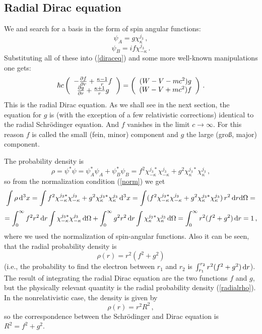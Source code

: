 \subsection{Radial Dirac equation}

We and search for a basis in the form of spin angular functions: 
\begin{equation}
  \psi_A=g\chi^{j_3}_{\kappa}\,,  \label{psia}
\end{equation}
\begin{equation}
  \psi_B=if\chi^{j_3}_{-\kappa}\,.  \label{psib}
\end{equation}
Substituting all of these into (\ref{diraceq}) and some more well-known manipulations one gets: 
\begin{equation}
  \hbar c \left(\begin{array}{c} -{\partial f\over\partial r}+{\kappa-1\over r}f\\ {\partial g\over\partial r}+{\kappa+1\over r}g\\ \end{array}\right)= \left(\begin{array}{c} (W-V-mc^2)g\\ (W-V+mc^2)f\\ \end{array}\right)\,.  \label{radialdirac}
\end{equation}
This is the radial Dirac equation. As we shall see in the next section, the equation for $g$ is (with the exception of a few relativistic corrections) identical to the radial Schrödinger equation. And $f$ vanishes in the limit $c\to\infty$. For this reason $f$ is called the small (fein, minor) component and $g$ the large (groß, major) component.

The probability density is 
\begin{equation*}
  \rho=\psi^*\psi=\psi^*_A\psi_A+\psi^*_B\psi_B= f^2\chi^{j_3*}_{-\kappa}\chi^{j_3}_{-\kappa}+ g^2\chi^{j_3*}_{\kappa}\chi^{j_3}_{\kappa}\,,
\end{equation*}
so from the normalization condition (\ref{norm}) we get 
\begin{equation*}
  \int \rho \,{\rm d}^3x= \int f^2\chi^{j_3*}_{-\kappa}\chi^{j_3}_{-\kappa}+ g^2\chi^{j_3*}_{\kappa}\chi^{j_3}_{\kappa} \,{\rm d}^3x= \int (f^2\chi^{j_3*}_{-\kappa}\chi^{j_3}_{-\kappa}+ g^2\chi^{j_3*}_{\kappa}\chi^{j_3}_{\kappa})\,r^2\,{\rm d} r{\rm d}\Omega=
\end{equation*}
\begin{equation*}
  =\int_0^\infty f^2r^2\,{\rm d} r\int\chi^{j_3*}_{-\kappa}\chi^{j_3}_{-\kappa} \,{\rm d}\Omega+ \int_0^\infty g^2r^2\,{\rm d} r\int\chi^{j_3*}_{\kappa}\chi^{j_3}_{\kappa} \,{\rm d}\Omega= \int_0^\infty r^2(f^2+g^2)\,{\rm d} r=1\,,
\end{equation*}
where we used the normalization of spin-angular functions. Also it can be seen, that the radial probability density is 
\begin{equation}
  \rho(r)=r^2(f^2+g^2)  \label{radialrho}
\end{equation}
(i.e., the probability to find the electron between $r_1$ and $r_2$ is $\int_{r_1}^{r_2}r^2(f^2+g^2)\,{\rm d} r$). The result of integrating the radial Dirac equation are the two functions $f$ and $g$, but the physically relevant quantity is the radial probability density (\ref{radialrho}). In the nonrelativistic case, the density is given by 
\begin{equation*}
  \rho(r)=r^2R^2\,,
\end{equation*}
so the correspondence between the Schrödinger and Dirac equation is $R^2=f^2+g^2$.

